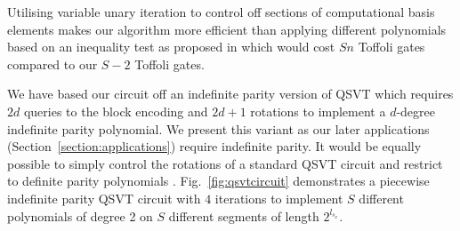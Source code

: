 Utilising variable unary iteration to control off sections of computational basis elements makes our algorithm more efficient than applying different polynomials based on an inequality test as proposed in \cite{mcardleQuantumStatePreparation2022} which would cost $Sn$ Toffoli gates compared to our $S-2$ Toffoli gates.

We have based our circuit off an indefinite parity version of QSVT \cite{sunderhauf2023generalizedquantumsingularvalue} which requires $2d$ queries to the block encoding and $2d + 1$ rotations to implement a $d$-degree indefinite parity polynomial. We present this variant as our later applications (Section~\ref{section:applications}) require indefinite parity. It would be equally possible to simply control the rotations of a standard QSVT circuit and restrict to definite parity polynomials \footnotemark[1].
Fig.~\ref{fig:qsvtcircuit} demonstrates a piecewise indefinite parity QSVT circuit with $4$ iterations to implement $S$ different polynomials of degree 2 on $S$ different segments of length $2^{l_{s_x}}$.

